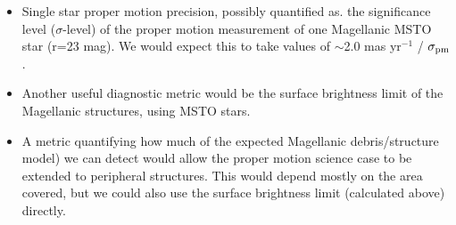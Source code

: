 \begin{itemize}

\item  Single star proper motion precision, possibly quantified as.
the significance level
($\sigma$-level) of the proper motion measurement of one Magellanic MSTO
star (r=23 mag). We would expect this to take values of
$\sim$2.0 mas yr$^{-1}$ / $\sigma_{\rm pm}$.

\item Another useful diagnostic metric would be the surface
brightness limit of the Magellanic structures, using MSTO stars.

\item A metric quantifying how much of the expected Magellanic debris/structure
\citet[from][]{2012MNRAS.421.2109B} model) we can detect would allow the
proper motion science case to be extended to peripheral structures.
This would depend
mostly on the area covered, but we could also use the surface
brightness limit (calculated above) directly.

\end{itemize}


